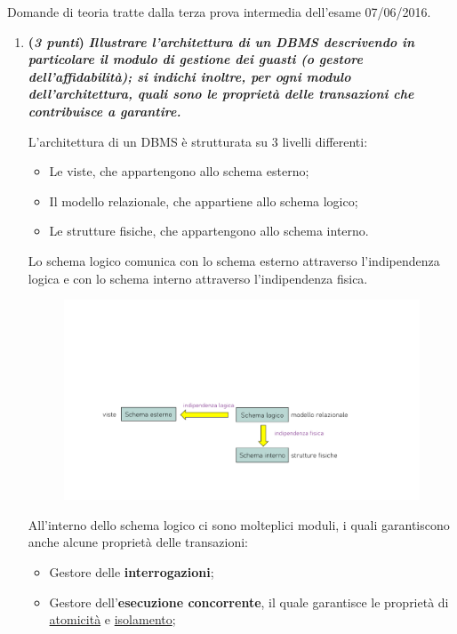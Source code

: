 \documentclass[a4paper]{article}
\begin{document}
	Domande di teoria tratte dalla terza prova intermedia dell'esame 07/06/2016.
	\begin{enumerate}
		\item \textbf{(\emph{3 punti})} \textcolor{Green4}{\textbf{\emph{Illustrare l'architettura di un DBMS descrivendo in particolare il modulo di gestione dei guasti (o gestore dell'affidabilità); si indichi inoltre, per ogni modulo dell'architettura, quali sono le proprietà delle transazioni che contribuisce a garantire.}}}\label{dom: gestione dei guasti}
		
		L'architettura di un DBMS è strutturata su 3 livelli differenti:
		\begin{itemize}
			\item Le viste, che appartengono allo schema esterno;
			\item Il modello relazionale, che appartiene allo schema logico;
			\item Le strutture fisiche, che appartengono allo schema interno.
		\end{itemize}
		Lo schema logico comunica con lo schema esterno attraverso l'indipendenza logica e con lo schema interno attraverso l'indipendenza fisica.
		\begin{figure}[!htp]
			\centering
			\includegraphics[width=\textwidth]{img/ex/arch-dbms-1.pdf}
		\end{figure}
		
		\noindent
		All'interno dello schema logico ci sono molteplici moduli, i quali garantiscono anche alcune proprietà delle transazioni:
		\begin{itemize}
			\item Gestore delle \textbf{interrogazioni};
			
			\item Gestore dell'\textbf{esecuzione concorrente}, il quale garantisce le proprietà di \underline{atomicità} e \underline{isolamento};
			

\end{itemize}
\end{enumerate}
\end{document}
